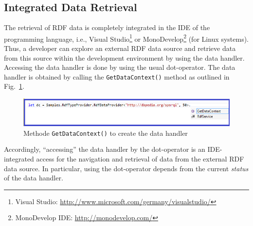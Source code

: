 \documentclass{llncs} %
\begin{document}
\subsection{Integrated Data Retrieval}
\label{sec:usage:retrieval}

The retrieval of RDF data is completely integrated in the IDE of the programming language,
i.e., Visual Studio\footnote{Visual Studio: \url{http://www.microsoft.com/germany/visualstudio/}}
or MonoDevelop\footnote{MonoDevelop IDE: \url{http://monodevelop.com/}} (for Linux systems).
Thus, a developer can explore an external RDF data source and retrieve data from this source
within the development environment  by using the data handler. Accessing the data handler is done by using  the usual dot-operator.
The data handler is obtained by calling the \texttt{GetDataContext()} method 
as outlined in Fig.~\ref{fig:getdc}.



\begin{figure}[h]
\centering
\includegraphics[width=0.99\linewidth]{./figs/getContext.png}
\caption{Methode \texttt{GetDataContext()} to create the data handler}
\label{fig:getdc}
\end{figure}


Accordingly, ``accessing'' the data handler by the dot-operator is an IDE-integrated
access for the navigation and retrieval of data from the external RDF data source.
In particular, using the dot-operator depends from the current \emph{status} of
the data handler. 
\end{document}
